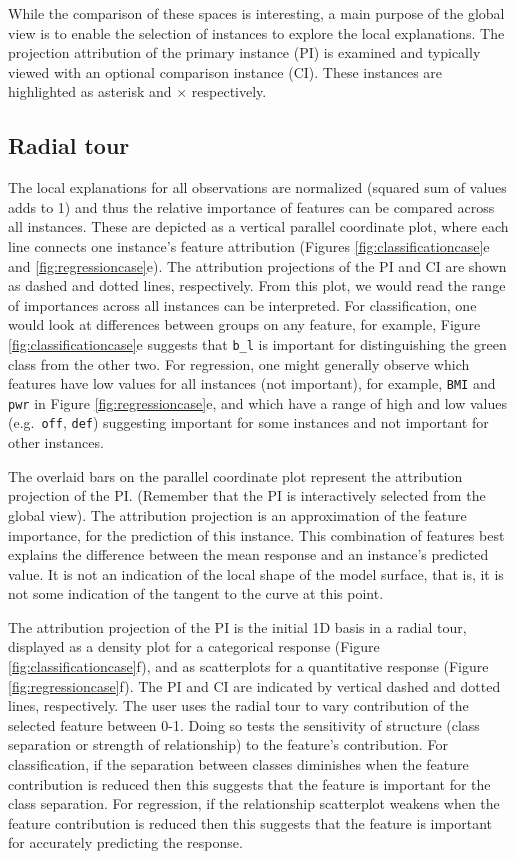\documentclass[
]{article}
\begin{document}
While the comparison of these spaces is interesting, a main purpose of the global view is to enable the selection of instances to explore the local explanations. The projection attribution of the primary instance (PI) is examined and typically viewed with an optional comparison instance (CI). These instances are highlighted as asterisk and \(\times\) respectively.

\hypertarget{radial-tour}{%
\subsection{Radial tour}\label{radial-tour}}

The local explanations for all observations are normalized (squared sum of values adds to 1) and thus the relative importance of features can be compared across all instances. These are depicted as a vertical parallel coordinate plot, where each line connects one instance's feature attribution (Figures \ref{fig:classificationcase}e and \ref{fig:regressioncase}e). The attribution projections of the PI and CI are shown as dashed and dotted lines, respectively. From this plot, we would read the range of importances across all instances can be interpreted. For classification, one would look at differences between groups on any feature, for example, Figure \ref{fig:classificationcase}e suggests that \texttt{b\_l} is important for distinguishing the green class from the other two. For regression, one might generally observe which features have low values for all instances (not important), for example, \texttt{BMI} and \texttt{pwr} in Figure \ref{fig:regressioncase}e, and which have a range of high and low values (e.g.~\texttt{off}, \texttt{def}) suggesting important for some instances and not important for other instances.

The overlaid bars on the parallel coordinate plot represent the attribution projection of the PI. (Remember that the PI is interactively selected from the global view). The attribution projection is an approximation of the feature importance, for the prediction of this instance. This combination of features best explains the difference between the mean response and an instance's predicted value. It is not an indication of the local shape of the model surface, that is, it is not some indication of the tangent to the curve at this point.

The attribution projection of the PI is the initial 1D basis in a radial tour, displayed as a density plot for a categorical response (Figure \ref{fig:classificationcase}f), and as scatterplots for a quantitative response (Figure \ref{fig:regressioncase}f). The PI and CI are indicated by vertical dashed and dotted lines, respectively. The user uses the radial tour to vary contribution of the selected feature between 0-1. Doing so tests the sensitivity of structure (class separation or strength of relationship) to the feature's contribution. For classification, if the separation between classes diminishes when the feature contribution is reduced then this suggests that the feature is important for the class separation. For regression, if the relationship scatterplot weakens when the feature contribution is reduced then this suggests that the feature is important for accurately predicting the response.
\end{document}
